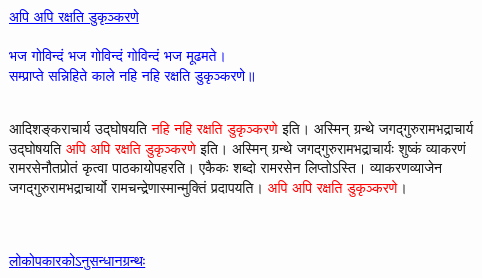 \vspace*{4mm}
\fontsize{14}{19}\selectfont
{}\nopagebreak\\
\fontsize{12}{16}\selectfont
{}\\
\pagebreak
\fontsize{18}{27}\selectfont
\centering\textcolor{blue}{\underline{अपि अपि रक्षति डुकृञ्करणे}}\nopagebreak\\
\vspace{4mm}
\fontsize{14}{21}\selectfont
{}\nopagebreak\\
\vspace{4mm}
\fontsize{14}{21}\selectfont\centering\textcolor{blue}{भज गोविन्दं भज गोविन्दं गोविन्दं भज मूढमते।\nopagebreak\\
सम्प्राप्ते सन्निहिते काले नहि नहि रक्षति डुकृञ्करणे॥}\\
\nopagebreak\\
\fontsize{14}{21}\selectfont
\begin{sloppypar}\justifying\noindent\hspace{10mm} आदि\-शङ्कराचार्य उद्घोषयति \textcolor{red}{नहि नहि रक्षति डुकृञ्करणे} इति। अस्मिन् ग्रन्थे जगद्गुरु\-रामभद्राचार्य उद्घोषयति \textcolor{red}{अपि अपि रक्षति डुकृञ्करणे} इति। अस्मिन् ग्रन्थे जगद्गुरुरामभद्राचार्यः शुष्कं व्याकरणं रामरसेनौतप्रोतं कृत्वा पाठकायोपहरति। एकैकः शब्दो रामरसेन लिप्तोऽस्ति। व्याकरण\-व्याजेन जगद्गुरु\-रामभद्राचार्यो रामचन्द्रेणास्मान्मुक्तिं प्रदापयति। \textcolor{red}{अपि अपि रक्षति डुकृञ्करणे}।\end{sloppypar}
\vspace{4mm}
\fontsize{14}{19}\selectfont
{}\nopagebreak\\
\fontsize{12}{16}\selectfont
{}\\
\vspace{8mm}
\fontsize{18}{27}\selectfont
\centering\textcolor{blue}{\underline{लोकोपकारकोऽनुसन्धानग्रन्थः}}\nopagebreak\\
